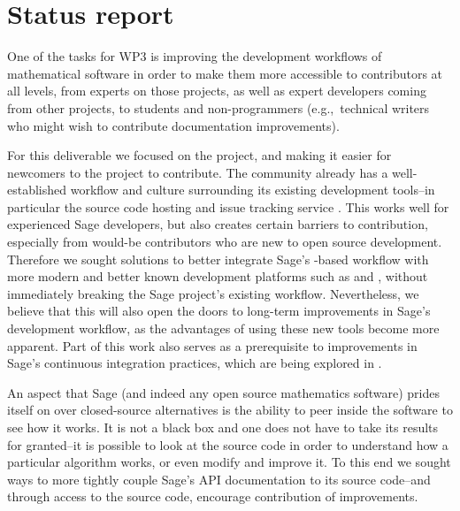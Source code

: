 \hypertarget{status-report}{%
\section{Status report}\label{status-report}}

One of the tasks for WP3 is improving the development workflows of mathematical
software in order to make them more accessible to contributors at all levels,
from experts on those projects, as well as expert developers coming from other
projects, to students and non-programmers (e.g.,~technical writers who might
wish to contribute documentation improvements).

For this deliverable we focused on the \Sage project, and making it easier for
newcomers to the project to contribute.  The \Sage community already has a
well-established workflow and culture
surrounding its existing development tools--in particular the source code
hosting and issue tracking service \Trac.  This works well for experienced
Sage developers, but also creates certain barriers to contribution, especially
from would-be contributors who are new to open source development.
Therefore
we sought solutions to better integrate Sage's \Trac-based workflow with more
modern and better known development platforms such as \GitHub and \GitLab,
without immediately breaking the Sage project's existing workflow.
%
%
Nevertheless, we believe that this will also open the doors to long-term
improvements in Sage's development workflow, as the advantages of using these
new tools become more apparent.  Part of this work also serves as a
prerequisite to improvements in Sage's continuous integration practices, which
are being explored in
.

An aspect that Sage (and indeed any open source mathematics software) prides
itself on over closed-source alternatives is the ability to peer inside the
software to see how it works.  It is not a black box and one does not have to
take its results for granted--it is possible to look at the source code in
order to understand how a particular algorithm works, or even modify and
improve it.  To this end we sought ways to more tightly couple Sage's API
documentation to its source code--and through access to the source code,
encourage contribution of improvements.

